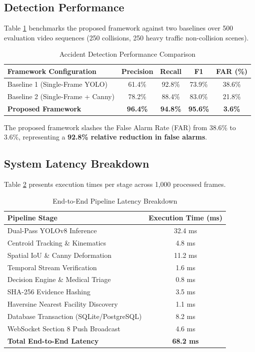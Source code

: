 \documentclass[conference]{IEEEtran}
\begin{document}
\subsection{Detection Performance}
Table \ref{tab:detection_results} benchmarks the proposed framework against two baselines over 500 evaluation video sequences (250 collisions, 250 heavy traffic non-collision scenes).

\begin{table}[htbp]
\caption{Accident Detection Performance Comparison}
\begin{center}
\begin{tabular}{lcccc}
\toprule
\textbf{Framework Configuration} & \textbf{Precision} & \textbf{Recall} & \textbf{F1} & \textbf{FAR (\%)} \\
\midrule
Baseline 1 (Single-Frame YOLO) & 61.4\% & 92.8\% & 73.9\% & 38.6\% \\
Baseline 2 (Single-Frame + Canny) & 78.2\% & 88.4\% & 83.0\% & 21.8\% \\
\textbf{Proposed Framework} & \textbf{96.4\%} & \textbf{94.8\%} & \textbf{95.6\%} & \textbf{3.6\%} \\
\bottomrule
\end{tabular}
\label{tab:detection_results}
\end{center}
\end{table}

The proposed framework slashes the False Alarm Rate (FAR) from 38.6\% to 3.6\%, representing a \textbf{92.8\% relative reduction in false alarms}.

\subsection{System Latency Breakdown}
Table \ref{tab:latency_results} presents execution times per stage across 1,000 processed frames.

\begin{table}[htbp]
\caption{End-to-End Pipeline Latency Breakdown}
\begin{center}
\begin{tabular}{lc}
\toprule
\textbf{Pipeline Stage} & \textbf{Execution Time (ms)} \\
\midrule
Dual-Pass YOLOv8 Inference & 32.4 ms \\
Centroid Tracking \& Kinematics & 4.8 ms \\
Spatial IoU \& Canny Deformation & 11.2 ms \\
Temporal Stream Verification & 1.6 ms \\
Decision Engine \& Medical Triage & 0.8 ms \\
SHA-256 Evidence Hashing & 3.5 ms \\
Haversine Nearest Facility Discovery & 1.1 ms \\
Database Transaction (SQLite/PostgreSQL) & 8.2 ms \\
WebSocket Section 8 Push Broadcast & 4.6 ms \\
\midrule
\textbf{Total End-to-End Latency} & \textbf{68.2 ms} \\
\bottomrule
\end{tabular}
\label{tab:latency_results}
\end{center}
\end{table}
\end{document}

